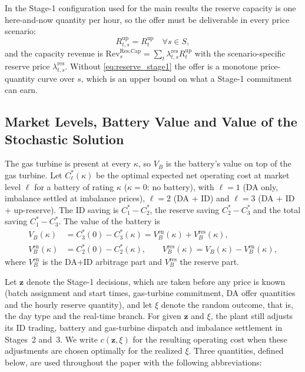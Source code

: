 \documentclass[5p,times,twocolumn]{elsarticle}
\begin{document}
In the Stage-1 configuration used for the main results the reserve capacity is one
here-and-now quantity per hour, so the offer must be deliverable in every price
scenario:
\begin{equation}
R_{t,s}^{\text{up}} = R_{t}^{\text{up}} \quad \forall s \in S,
\label{eq:reserve_stage1}
\end{equation}
and the capacity revenue is
$\text{Rev}_{s}^{\text{Res,Cap}}=\sum_{t}\lambda_{t,s}^{\text{res}}R_{t}^{\text{up}}$
with the scenario-specific reserve price $\lambda_{t,s}^{\text{res}}$. Without
\eqref{eq:reserve_stage1} the offer is a monotone price-quantity curve over $s$,
which is an upper bound on what a Stage-1 commitment can earn.
\subsection{Market Levels, Battery Value and Value of the Stochastic Solution}
\label{sec:metrics}
The gas turbine is present at every $\kappa$, so $V_B$ is the battery's value on top of the gas turbine. Let $C_\ell^*(\kappa)$ be the optimal expected net operating cost at market level $\ell$ for a battery of rating $\kappa$ ($\kappa=0$: no battery), with $\ell=1$ (DA only, imbalance settled at imbalance prices), $\ell=2$ (DA + ID) and $\ell=3$ (DA + ID + up-reserve). The ID saving is $C_1^*-C_2^*$, the reserve saving $C_2^*-C_3^*$ and the total saving $C_1^*-C_3^*$. The value of the battery is
\begin{align}
V_B(\kappa) &= C_3^*(0) - C_3^*(\kappa) = V_B^{\text{en}}(\kappa) + V_B^{\text{res}}(\kappa), \nonumber\\
V_B^{\text{en}}(\kappa) &= C_2^*(0)-C_2^*(\kappa), \qquad V_B^{\text{res}}(\kappa) = V_B(\kappa)-V_B^{\text{en}}(\kappa),
\label{eq:battery_value}
\end{align}
where $V_B^{\text{en}}$ is the DA+ID arbitrage part and $V_B^{\text{res}}$ the reserve part.

Let $\mathbf{z}$ denote the Stage-1 decisions, which are taken before any price is known (batch assignment and start times, gas-turbine commitment, DA offer quantities and the hourly reserve quantity), and let $\xi$ denote the random outcome, that is, the day type and the real-time branch. For given $\mathbf{z}$ and $\xi$, the plant still adjusts its ID trading, battery and gas-turbine dispatch and imbalance settlement in Stages~2 and~3. We write $c(\mathbf{z},\xi)$ for the resulting operating cost when these adjustments are chosen optimally for the realized $\xi$. Three quantities, defined below, are used throughout the paper with the following abbreviations:
\end{document}
